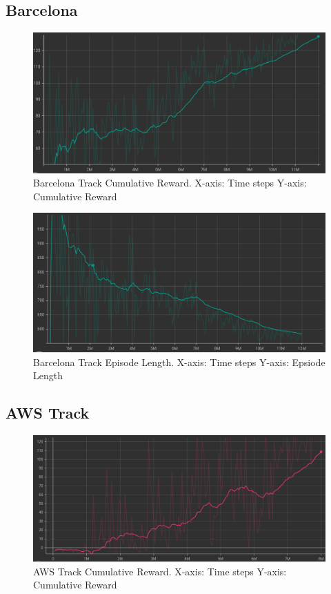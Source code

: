 \subsection{Barcelona}

\begin{figure}[H]
    \centering
    \includegraphics[width=1.0\textwidth]{images/graphs/Barcelona-Reward.png}
    \caption{Barcelona Track Cumulative Reward.  X-axis: Time steps  Y-axis: Cumulative Reward}
    \label{fig:7}
\end{figure}

\begin{figure}[H]
    \centering
    \includegraphics[width=1.0\textwidth]{images/graphs/Barcelona-Episode.png}
    \caption{Barcelona Track Episode Length.  X-axis: Time steps  Y-axis: Epsiode Length}
    \label{fig:8}
\end{figure}

\subsection{AWS Track}

\begin{figure}[H]
    \centering
    \includegraphics[width=1.0\textwidth]{images/graphs/AWS_baseline.png}
    \caption{AWS Track Cumulative Reward.  X-axis: Time steps  Y-axis: Cumulative Reward}
    \label{fig:9}
\end{figure}

